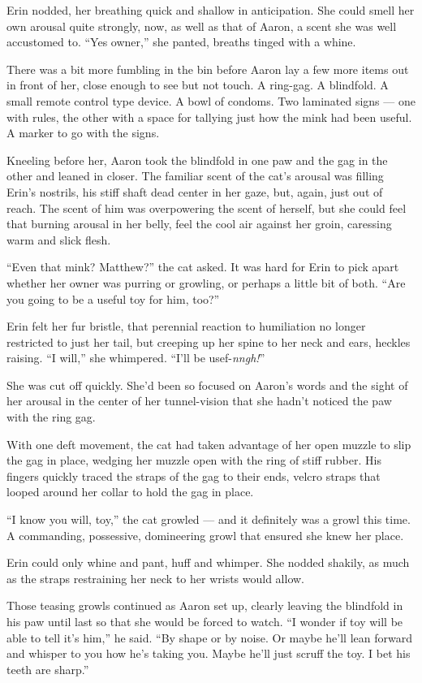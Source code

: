Erin nodded, her breathing quick and shallow in anticipation. She could smell her own arousal quite strongly, now, as well as that of Aaron, a scent she was well accustomed to. ``Yes owner,'' she panted, breaths tinged with a whine.

There was a bit more fumbling in the bin before Aaron lay a few more items out in front of her, close enough to see but not touch. A ring-gag. A blindfold. A small remote control type device. A bowl of condoms. Two laminated signs --- one with rules, the other with a space for tallying just how the mink had been useful. A marker to go with the signs.

Kneeling before her, Aaron took the blindfold in one paw and the gag in the other and leaned in closer. The familiar scent of the cat's arousal was filling Erin's nostrils, his stiff shaft dead center in her gaze, but, again, just out of reach. The scent of him was overpowering the scent of herself, but she could feel that burning arousal in her belly, feel the cool air against her groin, caressing warm and slick flesh.

``Even that mink? Matthew?'' the cat asked. It was hard for Erin to pick apart whether her owner was purring or growling, or perhaps a little bit of both. ``Are you going to be a useful toy for him, too?''

Erin felt her fur bristle, that perennial reaction to humiliation no longer restricted to just her tail, but creeping up her spine to her neck and ears, heckles raising. ``I will,'' she whimpered. ``I'll be usef-\textit{nngh!}''

She was cut off quickly. She'd been so focused on Aaron's words and the sight of her arousal in the center of her tunnel-vision that she hadn't noticed the paw with the ring gag.

With one deft movement, the cat had taken advantage of her open muzzle to slip the gag in place, wedging her muzzle open with the ring of stiff rubber. His fingers quickly traced the straps of the gag to their ends, velcro straps that looped around her collar to hold the gag in place.

``I know you will, toy,'' the cat growled --- and it definitely was a growl this time. A commanding, possessive, domineering growl that ensured she knew her place.

Erin could only whine and pant, huff and whimper. She nodded shakily, as much as the straps restraining her neck to her wrists would allow.

Those teasing growls continued as Aaron set up, clearly leaving the blindfold in his paw until last so that she would be forced to watch. ``I wonder if toy will be able to tell it's him,'' he said. ``By shape or by noise. Or maybe he'll lean forward and whisper to you how he's taking you. Maybe he'll just scruff the toy. I bet his teeth are sharp.''


